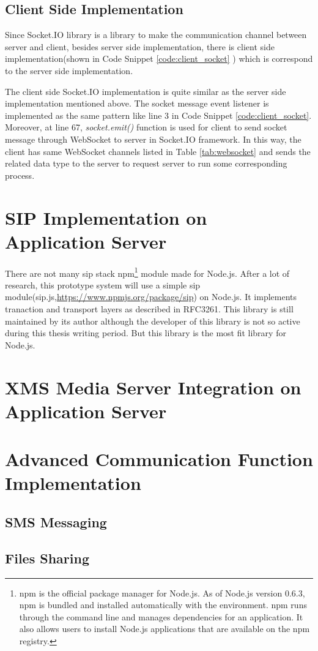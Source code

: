 \subsection{Client Side Implementation}

\par Since Socket.IO library is a library to make the communication channel between server and client, besides server side implementation, there is client side implementation(shown in Code Snippet \ref{code:client_socket} ) which is correspond to the server side implementation.

\par The client side Socket.IO implementation is quite similar as the server side implementation mentioned above. The socket message event listener is implemented as the same pattern like line 3 in Code Snippet \ref{code:client_socket}. Moreover, at line 67, \textit{socket.emit()} function is used for client to send socket message through WebSocket to server in Socket.IO framework. In this way, the client has same WebSocket channels listed in Table \ref{tab:websocket} and sends the related data type to the server to request server to run some corresponding process.
 

\section{SIP Implementation on Application Server}

\noindent There are not many \gls{sip} stack \gls{npm}\footnote{npm is the official package manager for Node.js. As of Node.js version 0.6.3, npm is bundled and installed automatically with the environment. npm runs through the command line and manages dependencies for an application. It also allows users to install Node.js applications that are available on the npm registry.\cite{wiki:npm}} module made for Node.js. After a lot of research, this prototype system will use a simple \gls{sip} module(sip.js,\url{https://www.npmjs.org/package/sip}) on Node.js. It implements tranaction and transport layers as described in RFC3261. This library is still maintained by its author although the developer of this library is not so active during this thesis writing period. But this library is the most fit library for Node.js.

\par 

\section{XMS Media Server Integration on Application Server}

\section{Advanced Communication Function Implementation}

\subsection{SMS Messaging}

\subsection{Files Sharing}